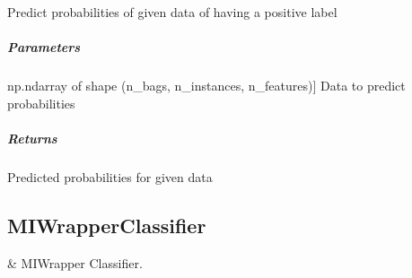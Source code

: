 \documentclass[letterpaper,10pt,english]{sphinxmanual}
\begin{document}
\begin{fulllineitems}
\begin{fulllineitems}
\label{\detokenize{classifier/mi/_autosummary/miml.classifier.mi.apr_classifier.APRClassifier:miml.classifier.mi.apr_classifier.APRClassifier.predict_proba}}
\pysigstartsignatures
{}
\pysigstopsignatures
\sphinxAtStartPar
Predict probabilities of given data of having a positive label


\subparagraph{Parameters}
\label{\detokenize{classifier/mi/_autosummary/miml.classifier.mi.apr_classifier.APRClassifier:id2}}\begin{description}
\sphinxlineitem{x\_test}{[}np.ndarray of shape (n\_bags, n\_instances, n\_features){]}
\sphinxAtStartPar
Data to predict probabilities

\end{description}


\subparagraph{Returns}
\label{\detokenize{classifier/mi/_autosummary/miml.classifier.mi.apr_classifier.APRClassifier:id3}}\begin{description}
\sphinxAtStartPar
Predicted probabilities for given data

\end{description}

\end{fulllineitems}


\end{fulllineitems}


\sphinxstepscope


\subsection{MIWrapperClassifier}
\label{\detokenize{classifier/mi/mi_wrapper_classifier:miwrapperclassifier}}\label{\detokenize{classifier/mi/mi_wrapper_classifier::doc}}

\begin{savenotes}\sphinxattablestart
\sphinxthistablewithglobalstyle
\sphinxthistablewithnovlinesstyle
\centering
\begin{tabulary}{\linewidth}[t]{}
\sphinxtoprule
\sphinxtableatstartofbodyhook
\sphinxAtStartPar
{\hyperref[\detokenize{classifier/mi/_autosummary/miml.classifier.mi.mi_wrapper_classifier.MIWrapperClassifier:miml.classifier.mi.mi_wrapper_classifier.MIWrapperClassifier}]{}}
&
\sphinxAtStartPar
MIWrapper Classifier.
\\
\sphinxbottomrule
\end{tabulary}
\sphinxtableafterendhook\par
\sphinxattableend\end{savenotes}
\end{document}
